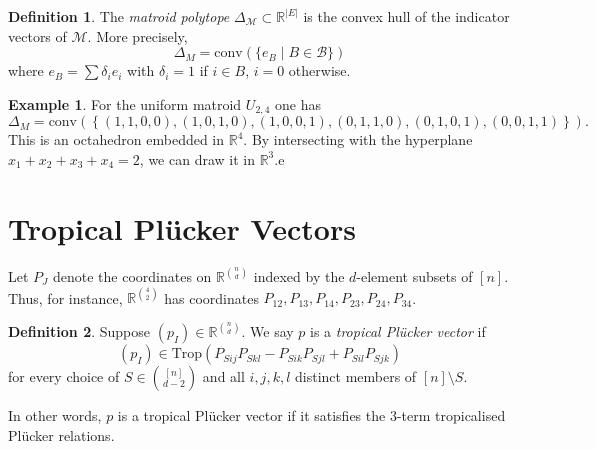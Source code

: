 \documentclass[12pt]{article}
\theoremstyle{definition}
\newtheorem{defn}{Definition}
\newtheorem{example}{Example}
\newcommand{\R}{\mathbb{R}}
\newcommand{\M}{\mathcal{M}}
\newcommand{\B}{\mathcal{B}}
\newcommand{\conv}{\text{conv}}
\newcommand{\Trop}{\text{Trop}}
\begin{document}
\begin{defn}
	The \textit{matroid polytope} $\Delta_\M \subset \R^{|E|}$ is the convex hull of the indicator vectors of $\M$. More precisely,
	\[ \Delta_M = \conv\left(\{e_B \mid B \in \B\}\right) \]
	where $e_B = \sum \delta_i e_i$ with $\delta_i = 1$ if $i \in B$, $i = 0$ otherwise.
\end{defn}
\begin{example}
For the uniform matroid $U_{2,4}$ one has 
\[ \Delta_M = \conv \left( \left\{ (1,1,0,0), (1,0,1,0),(1,0,0,1),(0,1,1,0),(0,1,0,1),(0,0,1,1) \right\} \right). \]
This is an octahedron embedded in $\R^4$. By intersecting with the hyperplane $x_1+x_2+x_3+x_4=2$, we can draw it in $\R^3$.e
\end{example}

\section{Tropical Pl\"ucker Vectors}
Let $P_J$ denote the coordinates on $\R^{\binom{n}{d}}$ indexed by the $d$-element subsets of $[n]$. Thus, for instance, $\R^{\binom{4}{2}}$ has coordinates $P_{12}, P_{13}, P_{14}, P_{23}, P_{24}, P_{34}$. 

\begin{defn}
	Suppose $(p_I) \in \R^{\binom{n}{d}}$. We say $p$ is a \textit{tropical Pl\"ucker vector} if
\[
(p_I) \in \Trop\left( P_{Sij}P_{Skl} - P_{Sik}P_{Sjl} + P_{Sil}P_{Sjk} \right)
\]
for every choice of $S \in \binom{[n]}{d-2}$ and all $i,j,k,l$ distinct members of $[n] \setminus S$. 
\end{defn}

In other words, $p$ is a tropical Pl\"ucker vector if it satisfies the 3-term tropicalised Pl\"ucker relations.
\end{document}
